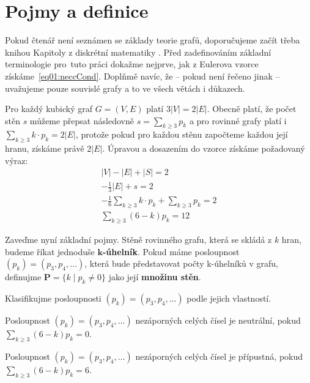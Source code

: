 
\chapter{Pojmy a definice}

Pokud čtenář není seznámen se základy teorie grafů, doporučujeme začít třeba knihou Kapitoly z diskrétní matematiky \cite{Matousek}. Před zadefinováním základní terminologie pro~tuto práci dokažme nejprve, jak z Eulerova vzorce získáme~\eqref{eq01:neccCond}. Doplňmě navíc, že -- pokud není řečeno jinak -- uvažujeme pouze souvislé grafy a to ve všech větách i důkazech.

\begin{dukaz}
Pro každý kubický graf $G = (V,E)$ platí $3 |V| = 2 |E|$. Obecně platí, že počet stěn $s$ můžeme přepsat následovně $s = \sum_{k \geq 3}{p_k}$ a pro rovinné grafy platí i~$ \sum_{k \geq 3}{k \cdot p_k}= 2|E|$, protože pokud pro každou stěnu započteme každou její hranu, získáme právě $2|E|$. Úpravou a dosazením do vzorce získáme požadovaný výraz: 
\begin{align*}
|V|-|E|+|S|=2 \\ -\frac{1}{3} |E| + s = 2 \\
-\frac{1}{6} \sum_{k \geq 3}{k \cdot p_k} + \sum_{k \geq 3}{p_k} = 2 \\ 
\sum_{k \geq 3}{(6-k)p_k}=12
\end{align*}
\end{dukaz}

Zaveďme nyní základní pojmy. Stěně rovinného grafu, která se skládá z $k$ hran, budeme říkat jednoduše \textbf{$\boldsymbol{k}$-úhelník}. Pokud máme posloupnost $(p_k) = (p_3,p_4,\dots)$, která bude představovat počty k-úhelníků v grafu, definujme $\boldsymbol{P} = \lbrace k \mid p_k \neq 0 \rbrace$ jako její \textbf{množinu stěn}.

Klasifikujme posloupnosti $(p_k) = (p_3,p_4,\dots)$ podle jejich vlastností.

\begin{definice}\label{def01:neutralni}
Posloupnost $(p_k) = (p_3,p_4,\dots)$ nezáporných celých čísel je neutrální, pokud $\sum_{k \geq 3}{(6-k)p_k}=0$.
\end{definice}

\begin{definice}\label{def01:pripustna}
Posloupnost $(p_k) = (p_3,p_4,\dots)$ nezáporných celých čísel je přípustná, pokud $\sum_{k \geq 3}{(6-k)p_k}=6$.
\end{definice}

